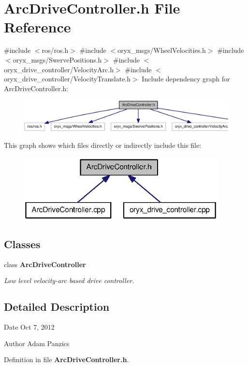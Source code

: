 \section{\-Arc\-Drive\-Controller.\-h \-File \-Reference}
\label{ArcDriveController_8h}
{\ttfamily \#include $<$ros/ros.\-h$>$}\*
{\ttfamily \#include $<$oryx\-\_\-msgs/\-Wheel\-Velocities.\-h$>$}\*
{\ttfamily \#include $<$oryx\-\_\-msgs/\-Swerve\-Positions.\-h$>$}\*
{\ttfamily \#include $<$oryx\-\_\-drive\-\_\-controller/\-Velocity\-Arc.\-h$>$}\*
{\ttfamily \#include $<$oryx\-\_\-drive\-\_\-controller/\-Velocity\-Translate.\-h$>$}\*
\-Include dependency graph for \-Arc\-Drive\-Controller.\-h\-:
\nopagebreak
\begin{figure}[H]
\begin{center}
\leavevmode
\includegraphics[width=350pt]{ArcDriveController_8h__incl}
\end{center}
\end{figure}
\-This graph shows which files directly or indirectly include this file\-:
\nopagebreak
\begin{figure}[H]
\begin{center}
\leavevmode
\includegraphics[width=302pt]{ArcDriveController_8h__dep__incl}
\end{center}
\end{figure}
\subsection*{\-Classes}
\begin{DoxyCompactItemize}
\item 
class {\bf \-Arc\-Drive\-Controller}
\begin{DoxyCompactList}\small\item\em \-Low level velocity-\/arc based drive controller. \end{DoxyCompactList}\end{DoxyCompactItemize}


\subsection{\-Detailed \-Description}
\begin{DoxyDate}{\-Date}
\-Oct 7, 2012 
\end{DoxyDate}
\begin{DoxyAuthor}{\-Author}
\-Adam \-Panzics 
\end{DoxyAuthor}


\-Definition in file {\bf \-Arc\-Drive\-Controller.\-h}.

